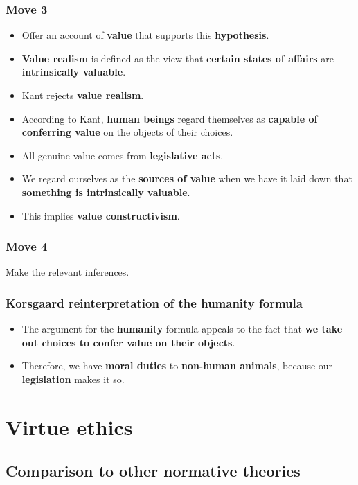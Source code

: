 \documentclass[11pt]{article}
\begin{document}
 \newpage
\subsubsection{Move 3}
\label{sec:org3268918}
\begin{itemize}
\item Offer an account of \textbf{value} that supports this \textbf{hypothesis}.
\item \textbf{Value realism} is defined as the view that \textbf{certain states of affairs} are \textbf{intrinsically valuable}.
\item Kant rejects \textbf{value realism}.
\item According to Kant, \textbf{human beings} regard themselves as \textbf{capable of conferring value} on the objects of their choices.
\item All genuine value comes from \textbf{legislative acts}.
\item We regard ourselves as the \textbf{sources of value} when we have it laid down that \textbf{something is intrinsically valuable}.
\item This implies \textbf{value constructivism}.
\end{itemize}
\subsubsection{Move 4}
\label{sec:org8075ed1}
Make the relevant inferences.
\subsubsection{Korsgaard reinterpretation of the humanity formula}
\label{sec:org3f5553e}
\begin{itemize}
\item The argument for the \textbf{humanity} formula appeals to the fact that \textbf{we take out choices to confer value on their objects}.
\item Therefore, we have \textbf{moral duties} to \textbf{non-human animals}, because our \textbf{legislation} makes it so.
\end{itemize}

 \newpage
\section{Virtue ethics}
\label{sec:orgd1b3dab}

\subsection{Comparison to other normative theories}
\label{sec:org7d01d93}
\end{document}

